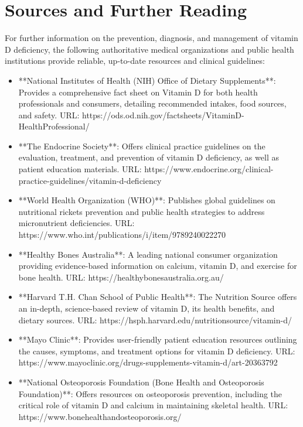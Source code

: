 \section*{Sources and Further Reading}
For further information on the prevention, diagnosis, and management of vitamin D deficiency, the following authoritative medical organizations and public health institutions provide reliable, up-to-date resources and clinical guidelines:
\begin{itemize}
    \item **National Institutes of Health (NIH) Office of Dietary Supplements**: Provides a comprehensive fact sheet on Vitamin D for both health professionals and consumers, detailing recommended intakes, food sources, and safety. URL: https://ods.od.nih.gov/factsheets/VitaminD-HealthProfessional/
    \item **The Endocrine Society**: Offers clinical practice guidelines on the evaluation, treatment, and prevention of vitamin D deficiency, as well as patient education materials. URL: https://www.endocrine.org/clinical-practice-guidelines/vitamin-d-deficiency
    \item **World Health Organization (WHO)**: Publishes global guidelines on nutritional rickets prevention and public health strategies to address micronutrient deficiencies. URL: https://www.who.int/publications/i/item/9789240022270
    \item **Healthy Bones Australia**: A leading national consumer organization providing evidence-based information on calcium, vitamin D, and exercise for bone health. URL: https://healthybonesaustralia.org.au/
    \item **Harvard T.H. Chan School of Public Health**: The Nutrition Source offers an in-depth, science-based review of vitamin D, its health benefits, and dietary sources. URL: https://hsph.harvard.edu/nutritionsource/vitamin-d/
    \item **Mayo Clinic**: Provides user-friendly patient education resources outlining the causes, symptoms, and treatment options for vitamin D deficiency. URL: https://www.mayoclinic.org/drugs-supplements-vitamin-d/art-20363792
    \item **National Osteoporosis Foundation (Bone Health and Osteoporosis Foundation)**: Offers resources on osteoporosis prevention, including the critical role of vitamin D and calcium in maintaining skeletal health. URL: https://www.bonehealthandosteoporosis.org/
\end{itemize}